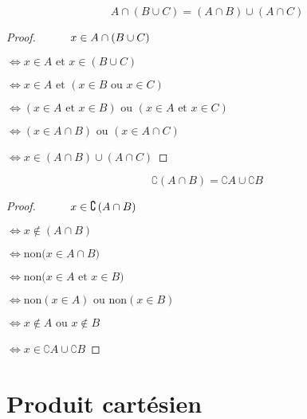 \begin{frame}
\[
A \cap (B \cup C) = (A \cap B) \cup (A \cap C)
\]
\pause
\begin{proof}
$\hphantom{\iff\ } x \in A \cap (B \cup C)$ \pause

$\iff x \in A \text{ et } x \in (B \cup C)$ \pause

$\iff  x \in A \text{ et } (x \in B \text{ ou } x \in C)$ \pause

$\iff (x \in A \text{ et } x\in B) \text{ ou } (x \in A \text{ et } x \in C)$ \pause

$\iff (x \in A \cap B) \text{ ou } (x \in A \cap C)$ \pause

$\iff x \in (A\cap B) \cup (A\cap C)$
\end{proof}

\end{frame}


\begin{frame}
$$\complement \left( A \cap B \right) = \complement A \cup \complement B$$  \pause
\begin{proof}
$\hphantom{\iff\ }x \in \complement \left( A \cap B \right)$ \pause

$\iff x \notin \left( A \cap B \right)$ \pause

$\iff \text{non} \big(x \in A \cap B\big)$ \pause

$\iff \text{non} \big(x \in A \text{ et } x \in B\big)$ \pause

$\iff \text{non} (x \in A) \text{ ou } \text{non} (x \in B)$ \pause

$\iff x \notin A \text{ ou } x\notin B$ \pause

$\iff x \in \complement A \cup \complement B$
\end{proof}

\end{frame}

\section{Produit cartésien}

